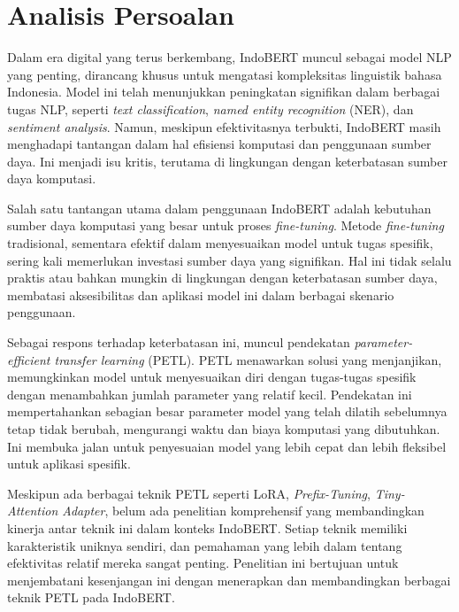 \section{Analisis Persoalan}

Dalam era digital yang terus berkembang, IndoBERT muncul sebagai model NLP yang penting, dirancang khusus untuk mengatasi kompleksitas linguistik bahasa Indonesia. Model ini telah menunjukkan peningkatan signifikan dalam berbagai tugas NLP, seperti \textit{text classification},  \textit{named entity recognition} (NER), dan \textit{sentiment analysis}. Namun, meskipun efektivitasnya terbukti, IndoBERT masih menghadapi tantangan dalam hal efisiensi komputasi dan penggunaan sumber daya. Ini menjadi isu kritis, terutama di lingkungan dengan keterbatasan sumber daya komputasi.

Salah satu tantangan utama dalam penggunaan IndoBERT adalah kebutuhan sumber daya komputasi yang besar untuk proses \textit{fine-tuning}. Metode \textit{fine-tuning} tradisional, sementara efektif dalam menyesuaikan model untuk tugas spesifik, sering kali memerlukan investasi sumber daya yang signifikan. Hal ini tidak selalu praktis atau bahkan mungkin di lingkungan dengan keterbatasan sumber daya, membatasi aksesibilitas dan aplikasi model ini dalam berbagai skenario penggunaan.

Sebagai respons terhadap keterbatasan ini, muncul pendekatan \textit{parameter-efficient transfer learning} (PETL). PETL menawarkan solusi yang menjanjikan, memungkinkan model untuk menyesuaikan diri dengan tugas-tugas spesifik dengan menambahkan jumlah parameter yang relatif kecil. Pendekatan ini mempertahankan sebagian besar parameter model yang telah dilatih sebelumnya tetap tidak berubah, mengurangi waktu dan biaya komputasi yang dibutuhkan. Ini membuka jalan untuk penyesuaian model yang lebih cepat dan lebih fleksibel untuk aplikasi spesifik.

Meskipun ada berbagai teknik PETL seperti LoRA, \textit{Prefix-Tuning}, \textit{Tiny-Attention Adapter}, belum ada penelitian komprehensif yang membandingkan kinerja antar teknik ini dalam konteks IndoBERT. Setiap teknik memiliki karakteristik uniknya sendiri, dan pemahaman yang lebih dalam tentang efektivitas relatif mereka sangat penting. Penelitian ini bertujuan untuk menjembatani kesenjangan ini dengan menerapkan dan membandingkan berbagai teknik PETL pada IndoBERT.
